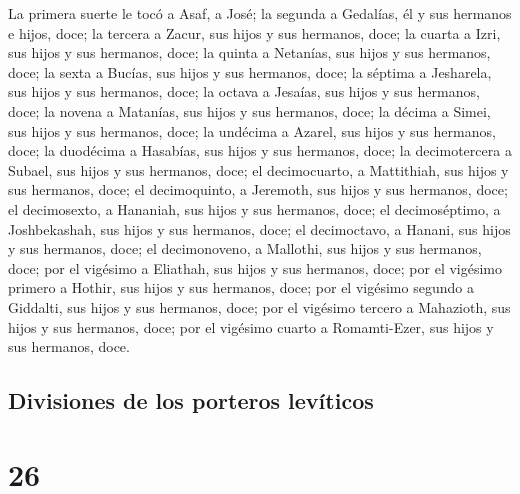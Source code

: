  La primera suerte le tocó a Asaf, a José; la segunda a
Gedalías, él y sus hermanos e hijos, doce;  la tercera a
Zacur, sus hijos y sus hermanos, doce;  la cuarta a Izri,
sus hijos y sus hermanos, doce;  la quinta a Netanías,
sus hijos y sus hermanos, doce;  la sexta a Bucías, sus
hijos y sus hermanos, doce;  la séptima a Jesharela, sus
hijos y sus hermanos, doce;  la octava a Jesaías, sus
hijos y sus hermanos, doce;  la novena a Matanías, sus
hijos y sus hermanos, doce;  la décima a Simei, sus hijos
y sus hermanos, doce;  la undécima a Azarel, sus hijos y
sus hermanos, doce;  la duodécima a Hasabías, sus hijos y
sus hermanos, doce;  la decimotercera a Subael, sus hijos
y sus hermanos, doce;  el decimocuarto, a Mattithiah, sus
hijos y sus hermanos, doce;  el decimoquinto, a Jeremoth,
sus hijos y sus hermanos, doce;  el decimosexto, a
Hananiah, sus hijos y sus hermanos, doce;  el
decimoséptimo, a Joshbekashah, sus hijos y sus hermanos, doce;
 el decimoctavo, a Hanani, sus hijos y sus hermanos,
doce;  el decimonoveno, a Mallothi, sus hijos y sus
hermanos, doce;  por el vigésimo a Eliathah, sus hijos y
sus hermanos, doce;  por el vigésimo primero a Hothir,
sus hijos y sus hermanos, doce;  por el vigésimo segundo
a Giddalti, sus hijos y sus hermanos, doce;  por el
vigésimo tercero a Mahazioth, sus hijos y sus hermanos, doce;
 por el vigésimo cuarto a Romamti-Ezer, sus hijos y sus
hermanos, doce.

\hypertarget{divisiones-de-los-porteros-levuxedticos}{%
\subsection{Divisiones de los porteros
levíticos}\label{divisiones-de-los-porteros-levuxedticos}}

\hypertarget{section-25}{%
\section{26}\label{section-25}}

